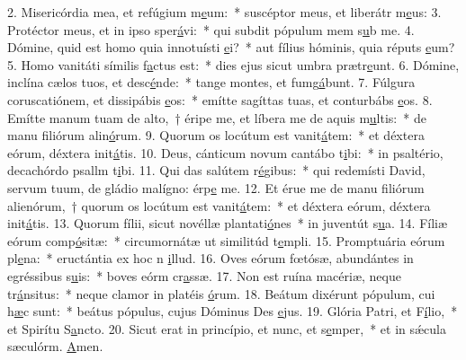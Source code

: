 2. Misericórdia mea, et refúgium m\uline{e}um:~* suscéptor meus, et liberátr m\uline{e}us:
3. Protéctor meus, et in ipso sper\uline{á}vi:~* qui subdit pópulum mem s\uline{u}b me.
4. Dómine, quid est homo quia innotuísti \uline{e}i?~* aut fílius hóminis, quia réputs \uline{e}um?
5. Homo vanitáti símilis f\uline{a}ctus est:~* dies ejus sicut umbra prætr\uline{e}unt.
6. Dómine, inclína cælos tuos, et desc\uline{é}nde:~* tange montes, et fumg\uline{á}bunt.
7. Fúlgura coruscatiónem, et dissipábis \uline{e}os:~* emítte sagíttas tuas, et conturbábs \uline{e}os.
8. Emítte manum tuam de alto,~† éripe me, et líbera me de aquis m\uline{u}ltis:~* de manu filiórum alin\uline{ó}rum.
9. Quorum os locútum est vanit\uline{á}tem:~* et déxtera eórum, déxtera init\uline{á}tis.
10. Deus, cánticum novum cantábo t\uline{i}bi:~* in psaltério, decachórdo psallm t\uline{i}bi.
11. Qui das salútem r\uline{é}gibus:~* qui redemísti David, servum tuum, de gládio malígno: érp\uline{e} me.
12. Et érue me de manu filiórum alienórum,~† quorum os locútum est vanit\uline{á}tem:~* et déxtera eórum, déxtera init\uline{á}tis.
13. Quorum fílii, sicut novéllæ plantati\uline{ó}nes~* in juventút s\uline{u}a.
14. Fíliæ eórum comp\uline{ó}sitæ:~* circumornátæ ut similitúd t\uline{e}mpli.
15. Promptuária eórum pl\uline{e}na:~* eructántia ex hoc n \uline{i}llud.
16. Oves eórum fœtósæ, abundántes in egréssibus s\uline{u}is:~* boves eórm cr\uline{a}ssæ.
17. Non est ruína macériæ, neque tr\uline{á}nsitus:~* neque clamor in platéis \uline{ó}rum.
18. Beátum dixérunt pópulum, cui h\uline{æ}c sunt:~* beátus pópulus, cujus Dóminus Des \uline{e}jus.
19. Glória Patri, et F\uline{í}lio,~* et Spirítu S\uline{a}ncto.
20. Sicut erat in princípio, et nunc, et s\uline{e}mper,~* et in sǽcula sæculórm. \uline{A}men.
